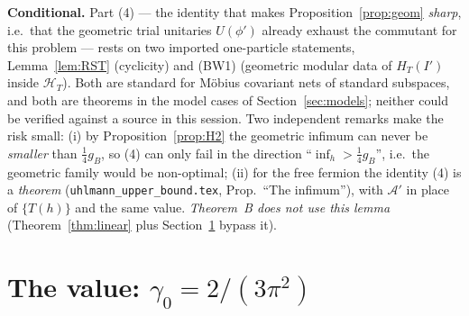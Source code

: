 \documentclass[11pt]{article}
\newcommand{\Hil}{\mathcal H}
\newcommand{\gB}{g_B}
\newcommand{\HT}{\Hil_T}
\newcommand{\HTR}{H_T}
\begin{document}
\begin{verdictgap}
\textbf{Conditional.}  Part (4) --- the identity that makes Proposition~\ref{prop:geom} \emph{sharp}, i.e.\
that the geometric trial unitaries $U(\phi')$ already exhaust the commutant for this problem --- rests on
two imported one-particle statements, Lemma~\ref{lem:RST} (cyclicity) and (BW1) (geometric modular data of
$\HTR(I')$ inside $\HT$).  Both are standard for M\"obius covariant nets of standard subspaces, and both
are theorems in the model cases of Section~\ref{sec:models}; neither could be verified against a source in
this session.  Two independent remarks make the risk small: (i) by Proposition~\ref{prop:H2} the geometric
infimum can never be \emph{smaller} than $\frac14\gB$, so (4) can only fail in the direction
``$\inf_h>\frac14\gB$'', i.e.\ the geometric family would be non-optimal; (ii) for the free fermion the
identity (4) is a \emph{theorem} (\texttt{uhlmann\_upper\_bound.tex}, Prop.~``The infimum''), with
$\mathcal A'$ in place of $\{T(h)\}$ and the same value.  \emph{Theorem~B does not use this lemma}
(Theorem~\ref{thm:linear} plus Section~\ref{sec:value} bypass it).
\end{verdictgap}

\section{The value: $\gamma_0=2/(3\pi^2)$}\label{sec:value}
\end{document}
